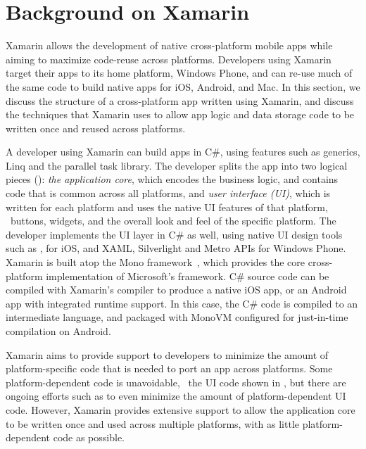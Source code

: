 \section{Background on Xamarin}
\label{section:background}

Xamarin allows the development of native cross-platform mobile apps while
aiming to maximize code-reuse across platforms. Developers using Xamarin target
their apps to its home platform, Windows Phone, and can re-use much of the same
code to build native apps for iOS, Android, and Mac. In this section, we
discuss the structure of a cross-platform app written using Xamarin, and
discuss the techniques that Xamarin uses to allow app logic and data storage
code to be written once and reused across platforms.

A developer using Xamarin can build apps in C\#, using features such as
generics, Linq and the parallel task library. The developer splits the app into
two logical pieces (): \textit{the application core},
which encodes the business logic, and contains code that is common across all
platforms, and \textit{user interface (UI)}, which is written for each platform
and uses the native UI features of that platform, \eg~buttons, widgets, and the
overall look and feel of the specific platform. The developer implements the UI
layer in C\# as well, using native UI design tools such as
,  for iOS, and XAML, Silverlight and
Metro APIs for Windows Phone. Xamarin is built atop the Mono 
framework~\cite{mono}, which provides the core cross-platform implementation of
Microsoft's  framework. C\# source code can be compiled with
Xamarin's compiler to produce a native iOS app, or an Android app with
integrated  runtime support. In this case, the C\# code is compiled
to an intermediate language, and packaged with MonoVM configured for
just-in-time compilation on Android.

Xamarin aims to provide support to developers to minimize the amount of
platform-specific code that is needed to port an app across platforms. Some
platform-dependent code is unavoidable, \eg~the UI code shown in
, but there are ongoing efforts such as
 to even minimize the amount of platform-dependent UI code.
However, Xamarin provides extensive support to allow the application core to be
written once and used across multiple platforms, with as little
platform-dependent code as possible. 

